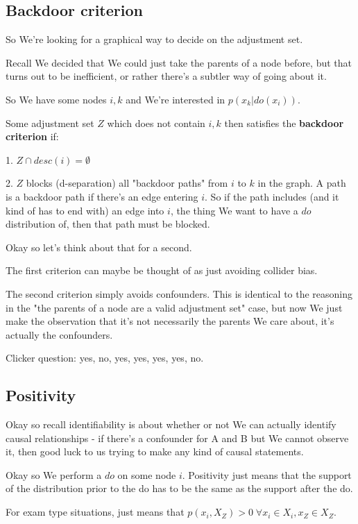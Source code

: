 \documentclass{article}
\begin{document}
	\subsection{Backdoor criterion}
	
		So We're looking for a graphical way to decide on the adjustment set.
		
		Recall We decided that We could just take the parents of a node before, but that turns out to be inefficient, or rather there's a subtler way of going about it.
		
		So We have some nodes $i, k$ and We're interested in $p(x_k|do(x_i))$. 
		
		Some adjustment set $Z$ which does not contain $i, k$ then satisfies the \textbf{backdoor criterion} if:
		
		1. $Z \cap desc(i) = \emptyset$
		 
		2. $Z$ blocks (d-separation) all "backdoor paths" from $i$ to $k$ in the graph. A path is a backdoor path if there's an edge entering $i$. So if the path includes (and it kind of has to end with) an edge into $i$, the thing We want to have a $do$ distribution of, then that path must be blocked.
		
		Okay so let's think about that for a second.
		
		The first criterion can maybe be thought of as just avoiding collider bias.
		
		The second criterion simply avoids confounders. This is identical to the reasoning in the "the parents of a node are a valid adjustment set" case, but now We just make the observation that it's not necessarily the parents We care about, it's actually the confounders.
		
		Clicker question: yes, no, yes, yes, yes, yes, no.
		
	\subsection{Positivity}
	
		Okay so recall identifiability is about whether or not We can actually identify causal relationships - if there's a confounder for A and B but We cannot observe it, then good luck to us trying to make any kind of causal statements.
		
		Okay so We perform a $do$ on some node $i$. Positivity just means that the support of the distribution prior to the do has to be the same as the support after the do. 
		
		For exam type situations, just means that $p(x_i, X_Z) > 0\; \forall x_i\in X_i, x_Z \in X_Z$.
		 
\end{document}

